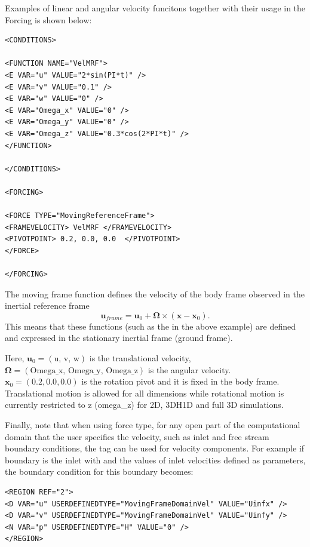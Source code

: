 Examples of linear and angular velocity funcitons together with their usage in the Forcing is shown below:

\begin{lstlisting}[style=XMLStyle]
<CONDITIONS>

<FUNCTION NAME="VelMRF">
<E VAR="u" VALUE="2*sin(PI*t)" />
<E VAR="v" VALUE="0.1" />
<E VAR="w" VALUE="0" />
<E VAR="Omega_x" VALUE="0" />
<E VAR="Omega_y" VALUE="0" />
<E VAR="Omega_z" VALUE="0.3*cos(2*PI*t)" />
</FUNCTION>

</CONDITIONS>

<FORCING>

<FORCE TYPE="MovingReferenceFrame">
<FRAMEVELOCITY> VelMRF </FRAMEVELOCITY>
<PIVOTPOINT> 0.2, 0.0, 0.0  </PIVOTPOINT>
</FORCE>

</FORCING>
\end{lstlisting}


The moving frame function defines the velocity of the body frame observed in the inertial reference frame $$\mathbf{u}_{frame} = \mathbf{u}_0 + \mathbf{\Omega}\times (\mathbf{x}-\mathbf{x}_0).$$ This means that these functions (such as the  in the above example) are defined and expressed in the stationary inertial frame (ground frame).

Here, $\mathbf{u}_0 = (\text{u, v, w})$ is the translational velocity, $\mathbf{\Omega}=(\text{Omega\_x, Omega\_y, Omega\_z})$ is the angular velocity.
$\mathbf{x}_0=(0.2, 0.0, 0.0)$ is the rotation pivot and it is fixed in the body frame.
Translational motion is allowed for all dimensions while rotational motion is currently restricted to z (omega\_z) for 2D, 3DH1D and full 3D simulations.

Finally, note that when using  force type, for any open part of the computational domain that the user specifies the velocity, such as inlet and free stream boundary conditions, the  tag can be used for velocity components. For example if boundary  is the inlet with  and  the values of inlet velocities defined as parameters, the boundary condition for this boundary becomes:

\begin{lstlisting}[style=XMLStyle]
<REGION REF="2"> 
<D VAR="u" USERDEFINEDTYPE="MovingFrameDomainVel" VALUE="Uinfx" />
<D VAR="v" USERDEFINEDTYPE="MovingFrameDomainVel" VALUE="Uinfy" />
<N VAR="p" USERDEFINEDTYPE="H" VALUE="0" />  
</REGION>
\end{lstlisting}

